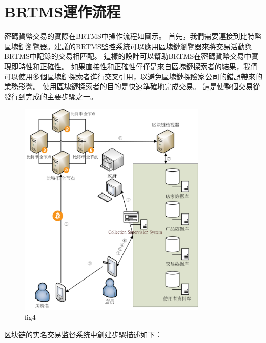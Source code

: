 	\section{BRTMS運作流程}
	密碼貨幣交易的實際在BRTMS中操作流程如圖示。 首先，我們需要連接到比特幣區塊鏈瀏覽器。建議的BRTMS監控系統可以應用區塊鏈瀏覽器來將交易活動與BRTMS中記錄的交易相匹配。 這樣的設計可以幫助BRTMS在密碼貨幣交易中實現即時性和正確性。 如果直接性和正確性僅僅是來自區塊鏈探索者的結果，我們可以使用多個區塊鏈探索者進行交叉引用，以避免區塊鏈探險家公司的錯誤帶來的業務影響。 使用區塊鏈探索者的目的是快速準確地完成交易。 這是使整個交易從發行到完成的主要步驟之一。	
	\begin{figure}[h]
		\centering
		\includegraphics[width = 0.8\textwidth]{fig4.png}
		\caption{fig4}\label{fig4}
	\end{figure}
	区块链的实名交易监督系统中創建步驟描述如下：

